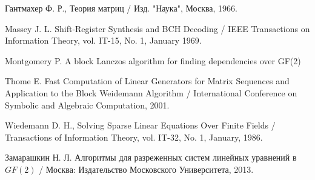 \begin{thebibliography}{4}
	 Гантмахер Ф. Р., Теория матриц / Изд. "Наука"{}, Москва, 1966.

	 Massey J. L. Shift-Register Synthesis and BCH Decoding / IEEE Transactions on Information Theory,
		vol. IT-15, No. 1, January 1969.

	 Montgomery P. A block Lanczos algorithm for finding dependencies over GF(2)

	 Thome E. Fast Computation of Linear Generators for Matrix Sequences and Application to the Block Weidemann Algorithm /
		International Conference on Symbolic and Algebraic Computation, 2001.

	 Wiedemann D. H., Solving Sparse Linear Equations Over Finite Fields / Transactions of Information Theory,
		vol. IT-32, No. 1, January, 1986.

	 Замарашкин Н. Л. Алгоритмы для разреженных систем линейных уравнений в $GF(2)$ / Москва: Издательство Московского
		Университета, 2013.
\end{thebibliography}

